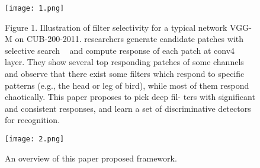 \documentclass[10pt,twocolumn,letterpaper]{article}
\begin{document}
\begin{figure}[!htb]
\begin{center}
   \texttt{[image: 1.png]}
\end{center}
   \caption{Figure 1. Illustration of filter selectivity for a typical network
VGG-M on CUB-200-2011. researchers generate candidate patches
with selective search ~\cite{J2013Selective} and compute response of each patch at
conv4 layer. They show several top responding patches of some
channels and observe that there exist some filters which respond
to specific patterns (e.g., the head or leg of bird), while most of
them respond chaotically. This paper proposes to pick deep fil-
ters with significant and consistent responses, and learn a set of
discriminative detectors for recognition.}
\label{fig:onecol}
\end{figure}

\begin{figure}[!htb]
\begin{center}
   \texttt{[image: 2.png]}
\end{center}
   \caption{An overview of this paper proposed framework.}
\label{fig:twocol}
\end{figure}


{\small


}
\end{document}

